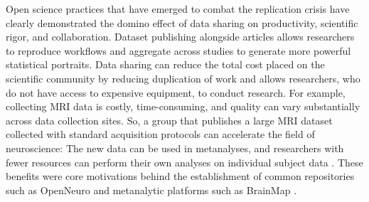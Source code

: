 \documentclass[conference]{IEEEtran}
\begin{document}
Open science practices that have emerged to combat the replication crisis have clearly demonstrated the domino effect of data sharing on productivity, scientific rigor, and collaboration. Dataset publishing alongside articles allows researchers to reproduce workflows and aggregate across studies to generate more powerful statistical portraits. Data sharing can reduce the total cost placed on the scientific community by reducing duplication of work and allows researchers, who do not have access to expensive equipment, to conduct research. For example, collecting MRI data is costly, time-consuming, and quality can vary substantially across data collection sites. So, a group that publishes a large MRI dataset collected with standard acquisition protocols can accelerate the field of neuroscience: The new data can be used in metanalyses, and researchers with fewer resources can perform their own analyses on individual subject data \cite{Nature2018}. These benefits were core motivations behind the establishment of common repositories such as OpenNeuro \cite{gorgolewski2017openneuro} and metanalytic platforms such as BrainMap \cite{laird2005brainmap}.


\end{document}
